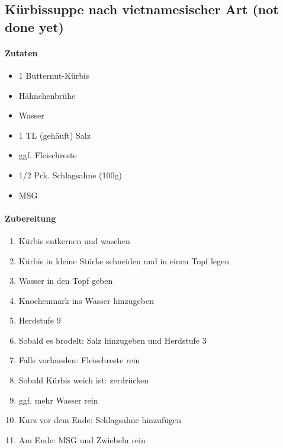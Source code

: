 \newpage
\subsection{Kürbissuppe nach vietnamesischer Art (not done yet)}
\paragraph{Zutaten}
\begin{itemize}[noitemsep]
	\item 1 Butternut-Kürbis
	\item Hähnchenbrühe
	\item Wasser 
	\item 1 TL (gehäuft) Salz
	\item ggf. Fleischreste
	\item 1/2 Pck. Schlagsahne (100g)
	\item MSG
\end{itemize}
\paragraph{Zubereitung}
\begin{enumerate}[noitemsep]
	\item Kürbis entkernen und waschen
	\item Kürbis in kleine Stücke schneiden und in einen Topf legen
	\item Wasser in den Topf geben
	\item Knochenmark ins Wasser hinzugeben
	\item Herdstufe 9
	\item Sobald es brodelt: Salz hinzugeben und Herdstufe 3
	\item Falls vorhanden: Fleischreste rein
	\item Sobald Kürbis weich ist: zerdrücken 
	\item ggf. mehr Wasser rein
	\item Kurz vor dem Ende: Schlagsahne hinzufügen
	\item Am Ende: MSG und Zwiebeln rein
\end{enumerate}